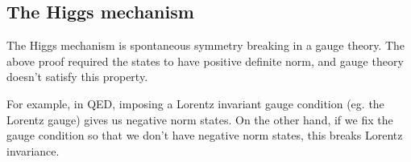 \documentclass[a4paper]{article}
\begin{document}
%
%
%

\subsection*{The Higgs mechanism}
The Higgs mechanism is spontaneous symmetry breaking in a gauge theory. The above proof required the states to have positive definite norm, and gauge theory doesn't satisfy this property.

For example, in QED, imposing a Lorentz invariant gauge condition (eg. the Lorentz gauge) gives us negative norm states. On the other hand, if we fix the gauge condition so that we don't have negative norm states, this breaks Lorentz invariance.
\end{document}
